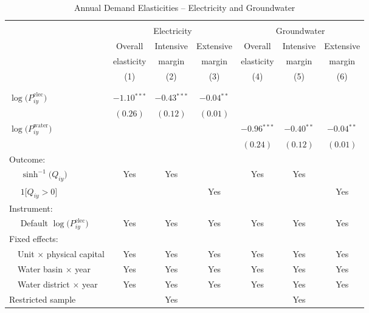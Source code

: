 \begin{table}[t!]\centering
\small
\caption{Annual Demand Elasticities -- Electricity and Groundwater \label{tab:ann_regs_main}}
\vspace{-0.1cm}
\small
\begin{adjustbox}{center} 
\begin{tabular}{lcccccc} 
\hline \hline
\vspace{-0.37cm}
\\
 & \multicolumn{3}{c}{Electricity} & \multicolumn{3}{c}{Groundwater} \\
 \cmidrule(r){2-4} \cmidrule(l){5-7}
 & Overall & Intensive & Extensive & Overall & Intensive & Extensive \\
 & elasticity & margin & margin & elasticity & margin & margin \\
[0.1em]
 & (1)  & (2)  & (3)  & (4)  & (5)  & (6) \\ 
\vspace{-0.37cm}
\\
\cline{2-7}
\vspace{-0.27cm}
\\
 $\log\big(P^{\text{elec}}_{iy}\big)$ ~ & $-1.10$$^{***}$  & $-0.43$$^{***}$ & $-0.04$$^{**}$ &  &  &  \\ 
& $(0.26)$ & $(0.12)$ & $(0.01)$ &  &  &  \\
[0.1em] 
 $\log\big(P^{\text{water}}_{iy}\big)$ ~ &  &  &  & $-0.96$$^{***}$ & $-0.40$$^{**}$  & $-0.04$$^{**}$ \\ 
&  &  &  & $(0.24)$ & $(0.12)$ & $(0.01)$ \\
[1.5em] 
Outcome: \\
~~ $\sinh^{-1}\big(Q_{iy}\big)$ & Yes & Yes & & Yes & Yes & \\
[0.1em] 
~~ $1\big[Q_{iy}>0\big]$ & & & Yes & & & Yes \\
[1.5em] 
Instrument: \\
[0.1em] 
~~ Default $\log\big(P^{\text{elec}}_{iy}\big)$  & Yes & Yes & Yes  & Yes  & Yes & Yes \\
[1.5em] 
Fixed effects: \\
[0.1em] 
~~Unit $\times$ physical capital & Yes & Yes & Yes & Yes & Yes & Yes  \\
[0.1em] 
~~Water basin $\times$ year & Yes & Yes & Yes & Yes & Yes & Yes \\
[0.1em] 
~~Water district $\times$ year & Yes & Yes & Yes & Yes & Yes & Yes \\
[1.5em] 
Restricted sample & & Yes & & & Yes & \\

\end{tabular}
\end{adjustbox}
\end{table}
